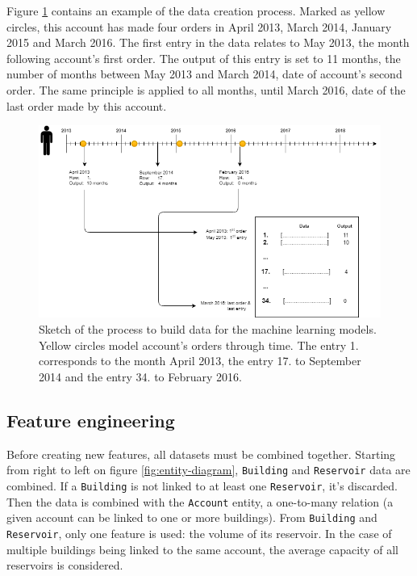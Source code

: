 Figure \ref{fig:data-build-example} contains an example of the data creation process. Marked as yellow circles, this account has made four orders in April 2013, March 2014, January 2015 and March 2016. The first entry in the data relates to May 2013, the month following account's first order. The output of this entry is set to 11 months, the number of months between May 2013 and March 2014, date of account's second order. The same principle is applied to all months, until March 2016, date of the last order made by this account.

\begin{figure}[htbp]
    \hspace{-1cm}
    \includegraphics[width=17cm]{images/data-build-ml-example.png}
    \caption[Process to build data for machine learning]{Sketch of the process to build data for the machine learning models. Yellow circles model account's orders through time. The entry 1. corresponds to the month April 2013, the entry 17. to September 2014 and the entry 34. to February 2016.}
    \label{fig:data-build-example}
\end{figure}


\subsection{Feature engineering}\label{sec:ml-features}

Before creating new features, all datasets must be combined together. Starting from right to left on figure \ref{fig:entity-diagram}, \texttt{Building} and \texttt{Reservoir} data are combined. If a \texttt{Building} is not linked to at least one \texttt{Reservoir}, it's discarded. Then the data is combined with the \texttt{Account} entity, a one-to-many relation (a given account can be linked to one or more buildings). From \texttt{Building} and \texttt{Reservoir}, only one feature is used: the volume of its reservoir. In the case of multiple buildings being linked to the same account, the average capacity of all reservoirs is considered.

